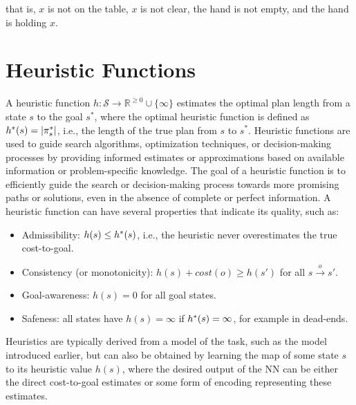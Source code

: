 \documentclass[ppgc,diss,english]{iiufrgs}
\begin{document}
that is, $x$ is not on the table, $x$ is not clear, the hand is not empty, and the hand is holding $x$.

\section{Heuristic Functions}
A heuristic function $h:\mathcal{S}\rightarrow \mathbb{R}^{\geq 0}\cup\{\infty\}$ estimates the optimal plan length from a state $s$ to the goal $s^*$, where the optimal heuristic function is defined as $h^{*}(s) = |\pi_{s}^{*}|$, i.e., the length of the true plan from $s$ to $s^{*}$. Heuristic functions are used to guide search algorithms, optimization techniques, or decision-making processes by providing informed estimates or approximations based on available information or problem-specific knowledge. The goal of a heuristic function is to efficiently guide the search or decision-making process towards more promising paths or solutions, even in the absence of complete or perfect information. A heuristic function can have several properties that indicate its quality, such as:

\begin{itemize}
        \item Admissibility: $h(s) \le h^{*}{(s)}$, i.e., the heuristic never overestimates the true cost-to-goal.
        \item Consistency (or monotonicity): $h(s) + cost(o) \ge h(s')$ for all $s \xrightarrow{o} s'$.
        \item Goal-awareness: $h(s) = 0$ for all goal states.
        \item Safeness: all states have $h(s) = \infty$ if $h^{*} (s) = \infty$, for example in dead-ends.
\end{itemize}

Heuristics are typically derived from a model of the task, such as the \sas model introduced earlier, but can also be obtained by learning the map of some state $s$ to its heuristic value $h(s)$, where the desired output of the NN can be either the direct cost-to-goal estimates or some form of encoding representing these estimates.
\end{document}
